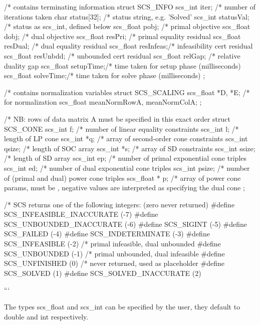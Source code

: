 \begin{DoxyVerb}
/* contains terminating information 
struct SCS_INFO {
    scs_int iter;       /* number of iterations taken 
    char status[32];    /* status string, e.g. 'Solved' 
    scs_int statusVal;  /* status as scs_int, defined below 
    scs_float pobj;     /* primal objective 
    scs_float dobj;     /* dual objective 
    scs_float resPri;   /* primal equality residual 
    scs_float resDual;  /* dual equality residual 
    scs_float resInfeas;/* infeasibility cert residual 
    scs_float resUnbdd; /* unbounded cert residual 
    scs_float relGap;   /* relative duality gap 
    scs_float setupTime;/* time taken for setup phase (milliseconds) 
    scs_float solveTime;/* time taken for solve phase (milliseconds) 
};


/* contains normalization variables 
struct SCS_SCALING {
    scs_float *D, *E; /* for normalization 
    scs_float meanNormRowA, meanNormColA;
};

/* NB: rows of data matrix A must be specified in this exact order 
struct SCS_CONE {
    scs_int f;          /* number of linear equality constraints 
    scs_int l;          /* length of LP cone 
    scs_int *q;         /* array of second-order cone constraints 
    scs_int qsize;      /* length of SOC array 
    scs_int *s;         /* array of SD constraints 
    scs_int ssize;      /* length of SD array 
    scs_int ep;         /* number of primal exponential cone triples 
    scs_int ed;         /* number of dual exponential cone triples 
    scs_int psize;      /* number of (primal and dual) power cone triples 
    scs_float * p;      /* array of power cone params, must be \in [-1, 1],
                           negative values are interpreted as specifying the dual cone 
};

/* SCS returns one of the following integers: (zero never returned)     
#define SCS_INFEASIBLE_INACCURATE   (-7)
#define SCS_UNBOUNDED_INACCURATE    (-6)
#define SCS_SIGINT                  (-5)
#define SCS_FAILED                  (-4)
#define SCS_INDETERMINATE           (-3)
#define SCS_INFEASIBLE              (-2) /* primal infeasible, dual unbounded   
#define SCS_UNBOUNDED               (-1) /* primal unbounded, dual infeasible   
#define SCS_UNFINISHED              (0)  /* never returned, used as placeholder 
#define SCS_SOLVED                  (1)
#define SCS_SOLVED_INACCURATE       (2)
\end{DoxyVerb}
 ```

The types {\ttfamily scs\-\_\-float} and {\ttfamily scs\-\_\-int} can be specified by the user, they default to {\ttfamily double} and {\ttfamily int} respectively.

